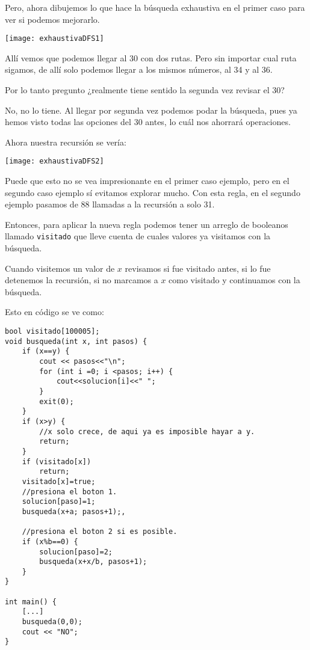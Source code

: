 Pero, ahora dibujemos lo que hace la búsqueda exhaustiva en el primer caso para ver si podemos mejorarlo.

\begin{center}
	\texttt{[image: exhaustivaDFS1]}
\end{center}

Allí vemos que podemos llegar al 30 con dos rutas. Pero sin importar cual ruta sigamos, de allí solo podemos llegar a los mismos números, al 34 y al 36.

Por lo tanto pregunto ¿realmente tiene sentido la segunda vez revisar el 30?

No, no lo tiene. Al llegar por segunda vez podemos podar la búsqueda, pues ya hemos visto todas las opciones del 30 antes, lo cuál nos ahorrará operaciones. 

Ahora nuestra recursión se vería:
\begin{center}
	\texttt{[image: exhaustivaDFS2]}
\end{center}

Puede que esto no se vea impresionante en el primer caso ejemplo, pero en el segundo caso ejemplo sí evitamos explorar mucho. Con esta regla, en el segundo ejemplo pasamos de 88 llamadas a la recursión a solo 31.

Entonces, para aplicar la nueva regla podemos tener un arreglo de booleanos llamado \verb|visitado| que lleve cuenta de cuales valores ya visitamos con la búsqueda.

Cuando visitemos un valor de \(x\) revisamos si fue visitado antes, si lo fue detenemos la recursión, si no marcamos a \(x\) como visitado y continuamos con la búsqueda.

Esto en código se ve como:

\begin{minipage}{\linewidth}
\begin{lstlisting}
bool visitado[100005];
void busqueda(int x, int pasos) {
	if (x==y) {
		cout << pasos<<"\n";
		for (int i =0; i <pasos; i++) {
			cout<<solucion[i]<<" ";
		}			
		exit(0);
	}
	if (x>y) {
		//x solo crece, de aqui ya es imposible hayar a y.
		return;
	}
	if (visitado[x]) 
		return;
	visitado[x]=true;
	//presiona el boton 1.
	solucion[paso]=1;
	busqueda(x+a; pasos+1);,
	
	//presiona el boton 2 si es posible.
	if (x%b==0) {
		solucion[paso]=2;
		busqueda(x+x/b, pasos+1);
	}
}

int main() {
	[...]
	busqueda(0,0);
	cout << "NO";
}
\end{lstlisting}
\end{minipage}

